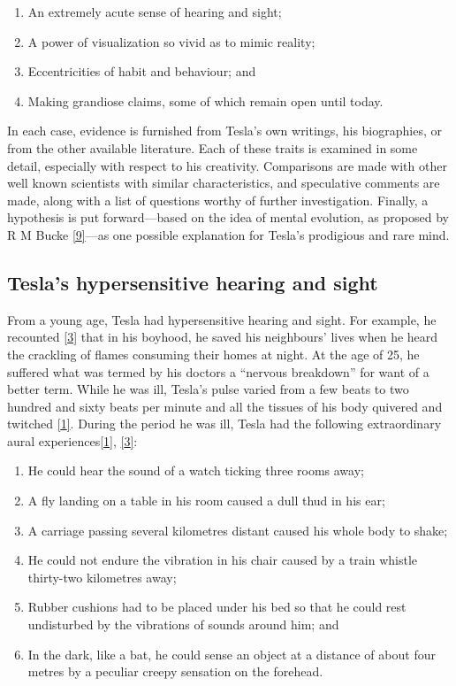 \documentclass[
  12pt,
  british,
  a4paper,
  rgb,
  dvipsnames,
  svgnames,
  hyphens]{article}
\providecommand{\tightlist}{%
  \setlength{\itemsep}{0pt}\setlength{\parskip}{0pt}}
\begin{document}
\begin{enumerate}
\tightlist
\item
  An extremely acute sense of hearing and sight;
\item
  A power of visualization so vivid as to mimic reality;
\item
  Eccentricities of habit and behaviour; and
\item
  Making grandiose claims, some of which remain open until today.
\end{enumerate}

In each case, evidence is furnished from Tesla's own writings, his
biographies, or from the other available literature. Each of these
traits is examined in some detail, especially with respect to his
creativity. Comparisons are made with other well known scientists with
similar characteristics, and speculative comments are made, along with a
list of questions worthy of further investigation. Finally, a hypothesis
is put forward---based on the idea of mental evolution, as proposed by R
M Bucke \protect\hyperlink{ref-bucke48}{{[}9{]}}---as one possible
explanation for Tesla's prodigious and rare mind.

\hypertarget{teslas-hypersensitive-hearing-and-sight}{%
\subsection{Tesla's hypersensitive hearing and
sight}\label{teslas-hypersensitive-hearing-and-sight}}

From a young age, Tesla had hypersensitive hearing and sight. For
example, he recounted \protect\hyperlink{ref-cheney81}{{[}3{]}} that in
his boyhood, he saved his neighbours' lives when he heard the crackling
of flames consuming their homes at night. At the age of 25, he suffered
what was termed by his doctors a ``nervous breakdown'' for want of a
better term. While he was ill, Tesla's pulse varied from a few beats to
two hundred and sixty beats per minute and all the tissues of his body
quivered and twitched \protect\hyperlink{ref-john83}{{[}1{]}}. During
the period he was ill, Tesla had the following extraordinary aural
experiences\protect\hyperlink{ref-john83}{{[}1{]}},
\protect\hyperlink{ref-cheney81}{{[}3{]}}:

\begin{enumerate}
\item
  He could hear the sound of a watch ticking three rooms away;
\item
  A fly landing on a table in his room caused a dull thud in his ear;
\item
  A carriage passing several kilometres distant caused his whole body to
  shake;
\item
  He could not endure the vibration in his chair caused by a train
  whistle thirty-two kilometres away;
\item
  Rubber cushions had to be placed under his bed so that he could rest
  undisturbed by the vibrations of sounds around him; and
\item
  In the dark, like a bat, he could sense an object at a distance of
  about four metres by a peculiar creepy sensation on the forehead.
\end{enumerate}
\end{document}
